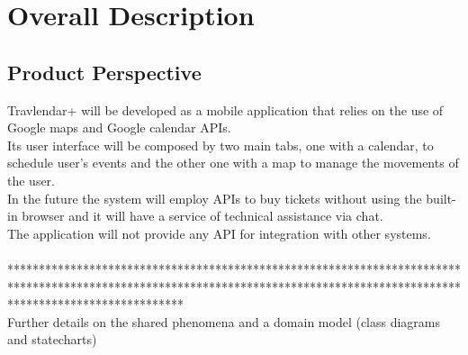 %
%
\chapter{Overall Description}
%
\label{cap:overalldescription}
%
%
\section{Product Perspective}
Travlendar+ will be developed as a mobile application that relies on the use of Google maps and Google calendar APIs. \\
Its user interface will be composed by two main tabs, one with a calendar, to schedule user's events and the other one with a map to manage the movements of the user. \\
In the future the system will employ APIs to buy tickets without using the built-in browser and it will have a service of technical assistance via chat. \\
The application will not provide any API for integration with other systems.
\\
\\
**************************************************************************************************************************************************************************** \\
Further details on the shared phenomena and a domain model (class diagrams and statecharts)
\\
\\
